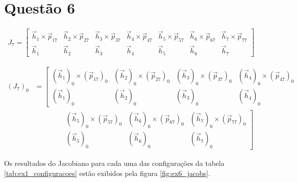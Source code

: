 \documentclass[a4paper,11pt]{article}
\theoremstyle{mytheor}
\begin{document}
\section*{Questão 6}

\begin{gather*}
J_7 = \begin{bmatrix} 
\vec{h}_1 \times \vec{p}_{17} & \vec{h}_2 \times \vec{p}_{27} & \vec{h}_3 \times \vec{p}_{37} & \vec{h}_4 \times \vec{p}_{47} & \vec{h}_5 \times \vec{p}_{57} & \vec{h}_6 \times \vec{p}_{67} & \vec{h}_7 \times \vec{p}_{77} \\
\vec{h}_1 & \vec{h}_2 & \vec{h}_3 & \vec{h}_4 & \vec{h}_5 & \vec{h}_6 & \vec{h}_7 \end{bmatrix}
\end{gather*}

\begin{equation*}
\begin{aligned}
(J_7)_0 &= 
\left[\begin{matrix} 
(\vec{h}_1)_0 \times (\vec{p}_{17})_0 & (\vec{h}_2)_0 \times (\vec{p}_{27})_0 & (\vec{h}_3)_0 \times (\vec{p}_{37})_0 & (\vec{h}_4)_0 \times (\vec{p}_{47})_0 \\
(\vec{h}_1)_0 & (\vec{h}_2)_0 & (\vec{h}_3)_0 & (\vec{h}_4)_0
\end{matrix}\right. \\
&\qquad\qquad
\left.\begin{matrix}
(\vec{h}_5)_0 \times (\vec{p}_{57})_0 & (\vec{h}_6)_0 \times (\vec{p}_{67})_0 & (\vec{h}_7)_0 \times (\vec{p}_{77})_0 \\
(\vec{h}_5)_0 & (\vec{h}_6)_0 & (\vec{h}_7)_0
\end{matrix}\right]
\end{aligned}
\end{equation*}

Os resultados do Jacobiano para cada uma das configurações da tabela \ref{tab:ex1_configuracoes} estão exibidos pela figura \ref{fig:ex6_jacobs}.
\end{document}
